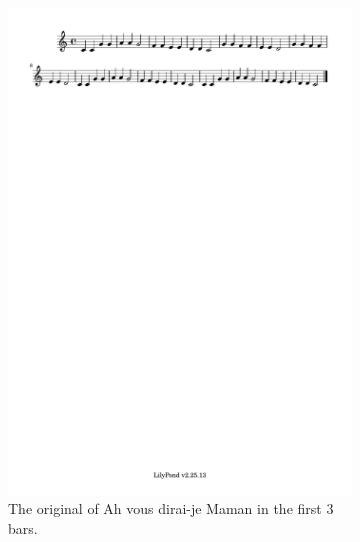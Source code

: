 \documentclass[11pt]{article}
\theoremstyle{definition}
\begin{document}
\begin{figure}
\centering
\begin{subfigure}{\textwidth}
  \centering
  \includegraphics[trim=1cm 26.5cm 10.055cm 0.02cm, clip, scale=1]{dabby_1.pdf} %
  \caption{The original of Ah vous dirai-je Maman in the first 3 bars.}
  \label{fig:Dabby1} 
\end{subfigure}
\begin{subfigure}{\textwidth}
  \centering

\end{subfigure}
\end{figure}
\end{document}

